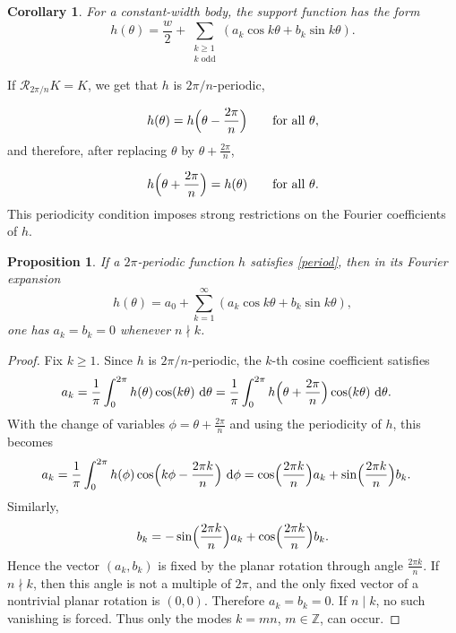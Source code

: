\documentclass[11pt,letterpaper,reqno]{amsart}
\newcommand{\dd}{\,\mathrm{d}}
\newtheorem{proposition}[theorem]{Proposition}
\newtheorem{corollary}[theorem]{Corollary}
\begin{document}
\begin{corollary}
For a constant-width body, the support function has the form
\[
h(\theta) = \frac{w}{2}
+ \sum_{\substack{k\ge1\\ k\text{ odd}}}
(a_k\cos k\theta + b_k\sin k\theta).
\]
\end{corollary}


If $\mathcal R_{2\pi/n}K=K$, we get that $h$ is $2\pi/n$-periodic,
\begin{explanation}
\[
h(\theta)=h\Bigl(\theta-\frac{2\pi}{n}\Bigr)
\qquad\text{for all }\theta,
\]
and therefore, after replacing $\theta$ by $\theta+\frac{2\pi}{n}$,
\end{explanation}
\begin{equation}\label{period}
  h\Bigl(\theta+\frac{2\pi}{n}\Bigr)=h(\theta)
\qquad\text{for all }\theta.  
\end{equation}
This periodicity condition imposes strong restrictions on the Fourier coefficients of $h$.

\begin{proposition} \label{prop:divisible}
If a $2\pi$-periodic function $h$ satisfies \eqref{period},
then in its Fourier expansion
\[
h(\theta)=a_0+\sum_{k=1}^{\infty}(a_k\cos k\theta+b_k\sin k\theta),
\]
one has $a_k=b_k=0$ whenever $n\nmid k$. 
\end{proposition}

\begin{proof}
Fix $k\ge1$. Since $h$ is $2\pi/n$-periodic, the $k$-th cosine coefficient satisfies
\begin{align*}
a_k
&=\frac{1}{\pi}\int_0^{2\pi} h(\theta)\cos(k\theta)\,\dd\theta=\frac{1}{\pi}\int_0^{2\pi} h\Bigl(\theta+\frac{2\pi}{n}\Bigr)\cos(k\theta)\,\dd\theta.
\end{align*}
With the change of variables $\phi=\theta+\frac{2\pi}{n}$ and using the periodicity of $h$, this becomes
\begin{align*}
a_k
&=\frac{1}{\pi}\int_0^{2\pi} h(\phi)\cos\Bigl(k\phi-\frac{2\pi k}{n}\Bigr)\,\dd\phi
=\cos\Bigl(\frac{2\pi k}{n}\Bigr)a_k+\sin\Bigl(\frac{2\pi k}{n}\Bigr)b_k.
\end{align*}
Similarly,
\[
b_k=-\sin\Bigl(\frac{2\pi k}{n}\Bigr)a_k+\cos\Bigl(\frac{2\pi k}{n}\Bigr)b_k.
\]
Hence the vector $(a_k,b_k)$ is fixed by the planar rotation through angle $\frac{2\pi k}{n}$. If $n\nmid k$, then this angle is not a multiple of $2\pi$, and the only fixed vector of a nontrivial planar rotation is $(0,0)$. Therefore $a_k=b_k=0$.
If $n\mid k$, no such vanishing is forced. Thus only the modes $k=mn$, $m \in \mathbb{Z}$, can occur.
\end{proof}
\end{document}
